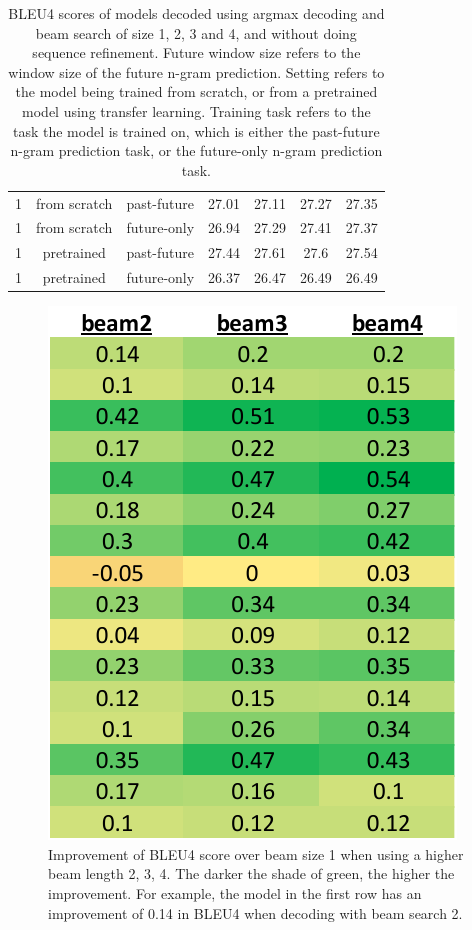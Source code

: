 \begin{table}[]
\begin{tabular}{|c|c|c|cccc|}
1                                                             & from scratch & past-future   & 27.01 & 27.11 & 27.27 & 27.35  \\ \cline{3-7} 
1                                                             & from scratch & future-only   & 26.94 & 27.29 & 27.41 & 27.37  \\ \cline{2-7} 
1                                                             & pretrained   & past-future   & 27.44 & 27.61 & 27.6  & 27.54  \\ \cline{3-7} 
1                                                             & pretrained   & future-only   & 26.37 & 26.47 & 26.49 & 26.49  \\ \hline
\end{tabular}
\caption{BLEU4 scores of models decoded using argmax decoding and beam search of size 1, 2, 3 and 4, and without doing sequence refinement. Future window size refers to the window size of the future n-gram prediction. Setting refers to the model being trained from scratch, or from a pretrained model using transfer learning. Training task refers to the task the model is trained on, which is either the past-future n-gram prediction task, or the future-only n-gram prediction task.}
\label{tab:beam_search_results_npe}
\end{table}

\begin{figure}[hpbt!]
    \centering
    \includegraphics{images/chap04_images/beam_search_improvements.pdf}
    \caption{Improvement of BLEU4 score over beam size 1 when using a higher beam length 2, 3, 4. The darker the shade of green, the higher the improvement. For example, the model in the first row has an improvement of 0.14 in BLEU4 when decoding with beam search 2.}
    \label{fig:beam_search_improvement}
\end{figure}

